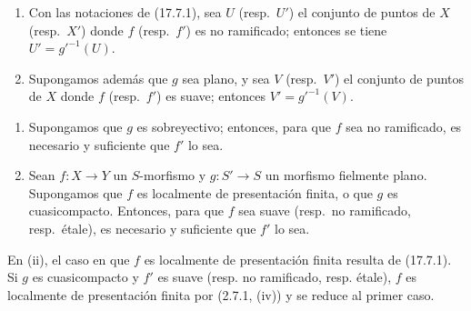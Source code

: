 \begin{corollary}[17.7.2]
\label{IV.17.7.2}
\begin{enumerate}
  \item[\textup{(i)}] Con las notaciones de \textup{(17.7.1)}, sea $U$ \textup{(resp.}\ $U'$\textup{)} el conjunto de puntos de $X$ \textup{(resp.}\ $X'$\textup{)} donde $f$ \textup{(resp.}\ $f'$\textup{)} es no ramificado; entonces se tiene $U'=g'^{-1}(U)$.
  \item[\textup{(ii)}] Supongamos además que $g$ sea plano, y sea $V$ \textup{(resp.}\ $V'$\textup{)} el conjunto de puntos de $X$ donde $f$ \textup{(resp.}\ $f'$\textup{)} es suave; entonces $V'=g'^{-1}(V)$.
\end{enumerate}
\end{corollary}

\begin{corollary}[17.7.3]
\label{IV.17.7.3}
\begin{enumerate}
  \item[\textup{(i)}] Supongamos que $g$ es sobreyectivo; entonces, para que $f$ sea no ramificado, es necesario y suficiente que $f'$ lo sea.
  \item[\textup{(ii)}] Sean $f:X\to Y$ un $S$-morfismo y $g:S'\to S$ un morfismo fielmente plano. Supongamos que $f$ es localmente de presentación finita, \textup{o} que $g$ es cuasicompacto. Entonces, para que $f$ sea suave \textup{(resp.}\ no ramificado, \textup{resp.}\ étale\textup{)}, es necesario y suficiente que $f'$ lo sea.
\end{enumerate}
\end{corollary}

En (ii), el caso en que $f$ es localmente de presentación finita resulta de (17.7.1). Si $g$ es cuasicompacto y $f'$ es suave (resp. no ramificado, resp. étale), $f$ es localmente de presentación finita por (2.7.1, (iv)) y se reduce al primer caso.

